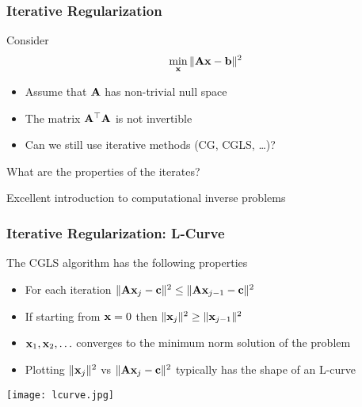 \documentclass[12pt,fleqn]{beamer}
\begin{document}
\begin{frame}
	\frametitle{Iterative Regularization}

Consider
$$
	\min_{\bf x} \| {\bf A} {\bf x} - {\bf b} \|^2
$$
\begin{itemize}
\item
Assume that ${\bf A}$ has non-trivial null space
\item The matrix ${\bf A}^{\top}{\bf A}$ is not invertible
\item Can we still use iterative methods (CG, CGLS, \ldots)?
\end{itemize}

\bigskip

What are the properties of the iterates? 

\bigskip

Excellent introduction to computational inverse problems~\cite{Hansen1998,Vogel2002,Hansen2010}

\end{frame}




\begin{frame}
	\frametitle{Iterative Regularization: L-Curve}


The CGLS algorithm has the following properties
\begin{itemize}
\item For each iteration $\| {\bf A} {\bf x}_j -{\bf c} \|^2 \le \| {\bf A} {\bf x}_{j-1} -{\bf c} \|^2$
\item If starting from  ${\bf x}=0$ then $\|{\bf x}_j  \|^2 \ge \|  {\bf x}_{j-1}  \|^2$

\item ${\bf x}_1,{\bf x}_2,\ldots$ converges to the minimum norm solution of the problem
\item Plotting $\|{\bf x}_j\|^2$ vs $\| {\bf A}{\bf x}_j -{\bf c} \|^2$ typically has the shape of an L-curve
\end{itemize}



\begin{center}
\texttt{[image: lcurve.jpg]}
\end{center}

\end{frame}
\end{document}
